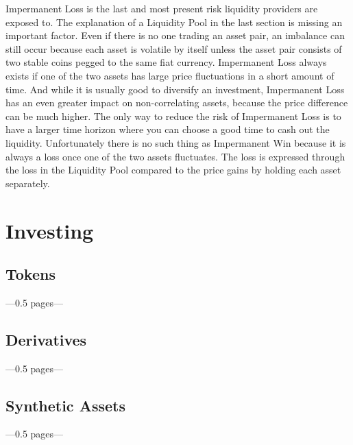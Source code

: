 Impermanent Loss is the last and most present risk liquidity providers are exposed to. The explanation of a Liquidity Pool in the last section is missing an important factor. Even if there is no one trading an asset pair, an imbalance can still occur because each asset is volatile by itself unless the asset pair consists of two stable coins pegged to the same fiat currency. Impermanent Loss always exists if one of the two assets has large price fluctuations in a short amount of time. And while it is usually good to diversify an investment, Impermanent Loss has an even greater impact on non-correlating assets, because the price difference can be much higher. The only way to reduce the risk of Impermanent Loss is to have a larger time horizon where you can choose a good time to cash out the liquidity. Unfortunately there is no such thing as Impermanent Win because it is always a loss once one of the two assets fluctuates. The loss is expressed through the loss in the Liquidity Pool compared to the price gains by holding each asset separately.

\section{Investing}
\subsection{Tokens}
---0.5 pages---
\subsection{Derivatives}
---0.5 pages---
\subsection{Synthetic Assets}
---0.5 pages---

